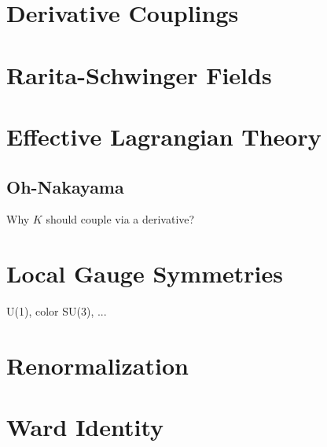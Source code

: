 \documentclass[12pt]{article}
\newcommand{\srcseventeen}[0]{myqft/versions/2017}
\begin{document}
\newpage
\section{Derivative Couplings}


\newpage
\section{Rarita-Schwinger Fields}

\section{Effective Lagrangian Theory}
\subsection{Oh-Nakayama}
Why $K$ should couple via a derivative?
\section{Local Gauge Symmetries}
U(1), color SU(3), ...\\

\section{Renormalization}
\section{Ward Identity}


\begin{comment}
\newpage
\setcounter{section}{10}
\section{interference terms}
\section{$\gamma p \rightarrow \phi X$}
\section{Sasha PRC72}
\section{$\gamma p \rightarrow K \Lambda$}
\end{comment}
\end{document}
